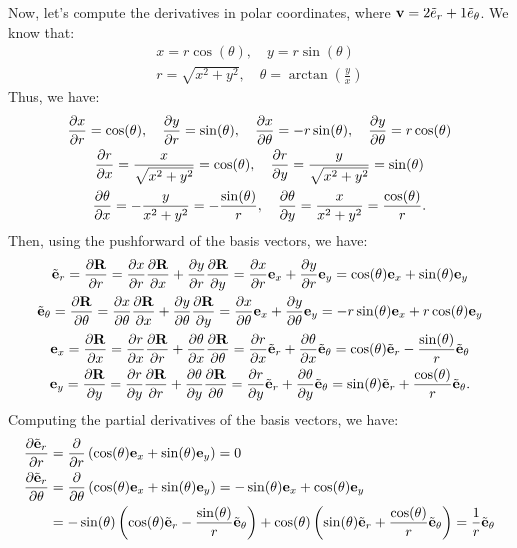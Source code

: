\begin{example}
  Now, let's compute the derivatives in polar coordinates, where $\mathbf{v} = 2\tilde{e}_r + 1\tilde{e}_\theta$.
  We know that:
  \begin{gather*}
    x = r\cos(\theta), \quad y = r\sin(\theta) \\
    r = \sqrt{x^2 + y^2}, \quad \theta = \arctan\left(\frac{y}{x}\right)
  \end{gather*}
  Thus, we have:
  \begin{gather*}
    \pdv{x}{r} = \cos(\theta), \quad \pdv{y}{r} = \sin(\theta), \quad \pdv{x}{\theta} = -r\sin(\theta), \quad \pdv{y}{\theta} = r\cos(\theta) \\
    \pdv{r}{x} = \frac{x}{\sqrt{x^2 + y^2}} = \cos(\theta), \quad \pdv{r}{y} = \frac{y}{\sqrt{x^2 + y^2}} = \sin(\theta) \\
    \pdv{\theta}{x} = -\frac{y}{x^2 + y^2} = -\frac{\sin(\theta)}{r}, \quad \pdv{\theta}{y} = \frac{x}{x^2 + y^2} = \frac{\cos(\theta)}{r}
  .\end{gather*}
  Then, using the pushforward of the basis vectors, we have:
  \begin{gather*}
    \tilde{\mathbf{e}}_r = \pdv{\mathbf{R}}{r} = \pdv{x}{r} \pdv{\mathbf{R}}{x} + \pdv{y}{r} \pdv{\mathbf{R}}{y} = \pdv{x}{r}\mathbf{e}_x + \pdv{y}{r}\mathbf{e}_y = \cos(\theta)\mathbf{e}_x + \sin(\theta)\mathbf{e}_y \\
    \tilde{\mathbf{e}}_\theta = \pdv{\mathbf{R}}{\theta} = \pdv{x}{\theta} \pdv{\mathbf{R}}{x} + \pdv{y}{\theta} \pdv{\mathbf{R}}{y} = \pdv{x}{\theta}\mathbf{e}_x + \pdv{y}{\theta}\mathbf{e}_y = -r\sin(\theta)\mathbf{e}_x + r\cos(\theta)\mathbf{e}_y \\
    \mathbf{e}_x = \pdv{\mathbf{R}}{x} = \pdv{r}{x} \pdv{\mathbf{R}}{r} + \pdv{\theta}{x} \pdv{\mathbf{R}}{\theta} = \pdv{r}{x}\tilde{\mathbf{e}}_r + \pdv{\theta}{x}\tilde{\mathbf{e}}_\theta = \cos(\theta)\tilde{\mathbf{e}}_r - \frac{\sin(\theta)}{r}\tilde{\mathbf{e}}_\theta \\
    \mathbf{e}_y = \pdv{\mathbf{R}}{y} = \pdv{r}{y} \pdv{\mathbf{R}}{r} + \pdv{\theta}{y} \pdv{\mathbf{R}}{\theta} = \pdv{r}{y}\tilde{\mathbf{e}}_r + \pdv{\theta}{y}\tilde{\mathbf{e}}_\theta = \sin(\theta)\tilde{\mathbf{e}}_r + \frac{\cos(\theta)}{r}\tilde{\mathbf{e}}_\theta
  .\end{gather*}
  Computing the partial derivatives of the basis vectors, we have:
  \begin{align*}
    \pdv{\tilde{\e}_r}{r} &= \pdv{}{r}\left(\cos(\theta)\e_x + \sin(\theta)\e_y\right) = 0 \\
    \pdv{\tilde{\e}_r}{\theta} &= \pdv{}{\theta}\left(\cos(\theta)\e_x + \sin(\theta)\e_y\right) = -\sin(\theta)\e_x + \cos(\theta)\e_y \\
                                &= -\sin(\theta)\left(\cos(\theta)\tilde{\e}_r - \frac{\sin(\theta)}{r}\tilde{\e}_\theta\right) + \cos(\theta)\left(\sin(\theta)\tilde{\e}_r + \frac{\cos(\theta)}{r}\tilde{\e}_\theta\right) = \frac{1}{r}\tilde{\e}_\theta \\

\end{align*}
\end{example}
